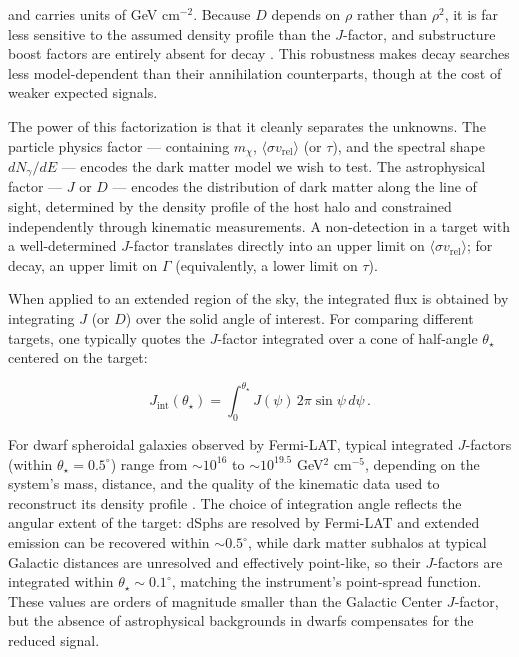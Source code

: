 and carries units of GeV cm$^{-2}$.
Because $D$ depends on $\rho$ rather than $\rho^2$, it is far less sensitive to the assumed density profile than the $J$-factor, and substructure boost factors are entirely absent for decay \cite{Cirelli:2024ssz}.
This robustness makes decay searches less model-dependent than their annihilation counterparts, though at the cost of weaker expected signals.

The power of this factorization is that it cleanly separates the unknowns.
The particle physics factor --- containing $m_\chi$, $\langle \sigma v_\text{rel} \rangle$ (or $\tau$), and the spectral shape $dN_\gamma/dE$ --- encodes the dark matter model we wish to test.
The astrophysical factor --- $J$ or $D$ --- encodes the distribution of dark matter along the line of sight, determined by the density profile of the host halo and constrained independently through kinematic measurements.
A non-detection in a target with a well-determined $J$-factor translates directly into an upper limit on $\langle \sigma v_\text{rel} \rangle$; for decay, an upper limit on $\Gamma$ (equivalently, a lower limit on $\tau$).

When applied to an extended region of the sky, the integrated flux is obtained by integrating $J$ (or $D$) over the solid angle of interest.
For comparing different targets, one typically quotes the $J$-factor integrated over a cone of half-angle $\theta_\star$ centered on the target:

\begin{equation}
	J_\text{int}(\theta_\star) = \int_0^{\theta_\star} J(\psi) \, 2\pi \sin\psi \, d\psi \,.
	\label{eq:jfactor_int}
\end{equation}

For dwarf spheroidal galaxies observed by Fermi-LAT, typical integrated $J$-factors (within $\theta_\star = 0.5^\circ$) range from $\sim 10^{16}$ to $\sim 10^{19.5}$ GeV$^2$ cm$^{-5}$, depending on the system's mass, distance, and the quality of the kinematic data used to reconstruct its density profile \cite{Hooper:2024,Cirelli:2024ssz,Bonnivard:2015xpq}.
The choice of integration angle reflects the angular extent of the target: dSphs are resolved by Fermi-LAT and extended emission can be recovered within $\sim 0.5^\circ$, while dark matter subhalos at typical Galactic distances are unresolved and effectively point-like, so their $J$-factors are integrated within $\theta_\star \sim 0.1^\circ$, matching the instrument's point-spread function.
These values are orders of magnitude smaller than the Galactic Center $J$-factor, but the absence of astrophysical backgrounds in dwarfs compensates for the reduced signal.


